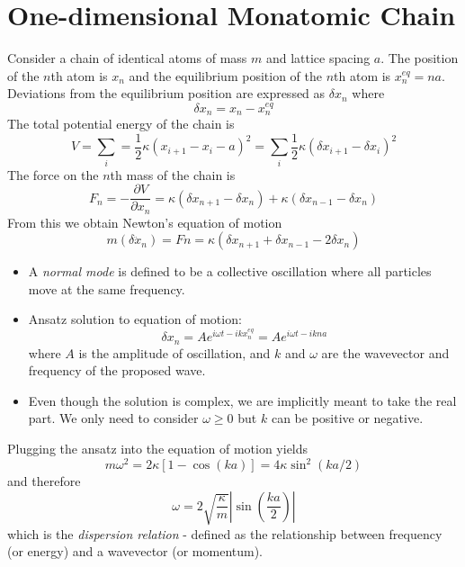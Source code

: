 \documentclass[10pt]{article}
\begin{document}
\maketitle


\section{One-dimensional Monatomic Chain}
Consider a chain of identical atoms of mass $m$ and lattice spacing $a$. The position of the $n$th atom is $x_{n}$
and the equilibrium position of the $n$th atom is $x_{n}^{eq} = na$. Deviations from the equilibrium position are
expressed as $\delta x_{n}$ where
$$\delta x_{n} = x_{n} - x_{n}^{eq} $$
The total potential energy of the chain is
$$V = \sum_{i} = \frac{1}{2}\kappa(x_{i+1}-x_{i}-a)^{2} = \sum_{i}\frac{1}{2}\kappa(\delta x_{i+1} - \delta x_{i})^{2}$$
The force on the $n$th mass of the chain is
$$F_{n} = -\frac{\partial V}{\partial x_{n}} = \kappa(\delta x_{n+1} - \delta x_{n}) + \kappa(\delta x_{n-1} - \delta x_{n})$$
From this we obtain Newton's equation of motion
$$m(\delta \ddot{x}_{n}) = F{n} =  \kappa(\delta x_{n+1}+ \delta x_{n-1} - 2\delta x_{n})$$

\begin{itemize}
  \item A \emph{normal mode} is defined to be a collective oscillation where all particles move at the same frequency.
  \item Ansatz solution to equation of motion:
  $$\delta x_{n} = Ae^{i\omega t - ikx_{n}^{eq}} = Ae^{i\omega t - ikna}$$
  where $A$ is the amplitude of oscillation, and $k$ and $\omega$ are the wavevector and frequency of the proposed wave.
  \item Even though the solution is complex, we are implicitly meant to take the real part. We only need to consider $\omega \geq 0$
  but $k$ can be positive or negative.
\end{itemize}

Plugging the ansatz into the equation of motion yields
$$m\omega^{2} = 2\kappa\left [ 1-\cos(ka)\right] = 4\kappa \sin^{2}(ka/2)$$
and therefore
$$\omega = 2\sqrt{\frac{\kappa}{m}} \left | \sin(\frac{ka}{2})\right |$$
which is the \emph{dispersion relation} - defined as the relationship between frequency (or energy) and a wavevector (or momentum).
\end{document}
